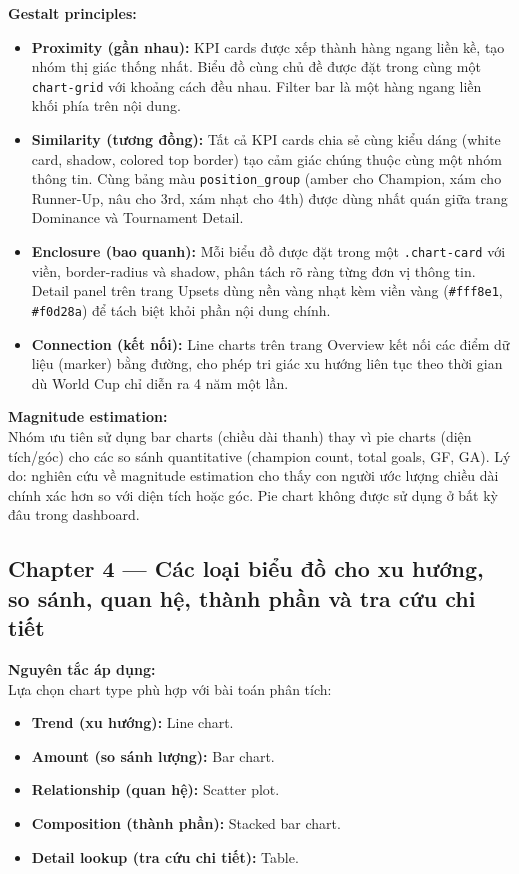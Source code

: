 \documentclass[12pt,a4paper]{article}
\begin{document}
\textbf{Gestalt principles:}
\begin{itemize}
    \item \textbf{Proximity (gần nhau):} KPI cards được xếp thành hàng ngang liền kề, tạo nhóm thị giác thống nhất. Biểu đồ cùng chủ đề được đặt trong cùng một \texttt{chart-grid} với khoảng cách đều nhau. Filter bar là một hàng ngang liền khối phía trên nội dung.
    \item \textbf{Similarity (tương đồng):} Tất cả KPI cards chia sẻ cùng kiểu dáng (white card, shadow, colored top border) tạo cảm giác chúng thuộc cùng một nhóm thông tin. Cùng bảng màu \texttt{position\_group} (amber cho Champion, xám cho Runner-Up, nâu cho 3rd, xám nhạt cho 4th) được dùng nhất quán giữa trang Dominance và Tournament Detail.
    \item \textbf{Enclosure (bao quanh):} Mỗi biểu đồ được đặt trong một \texttt{.chart-card} với viền, border-radius và shadow, phân tách rõ ràng từng đơn vị thông tin. Detail panel trên trang Upsets dùng nền vàng nhạt kèm viền vàng (\texttt{\#fff8e1}, \texttt{\#f0d28a}) để tách biệt khỏi phần nội dung chính.
    \item \textbf{Connection (kết nối):} Line charts trên trang Overview kết nối các điểm dữ liệu (marker) bằng đường, cho phép tri giác xu hướng liên tục theo thời gian dù World Cup chỉ diễn ra 4 năm một lần.
\end{itemize}

\textbf{Magnitude estimation:} \\
Nhóm ưu tiên sử dụng bar charts (chiều dài thanh) thay vì pie charts (diện tích/góc) cho các so sánh quantitative (champion count, total goals, GF, GA). Lý do: nghiên cứu về magnitude estimation cho thấy con người ước lượng chiều dài chính xác hơn so với diện tích hoặc góc. Pie chart không được sử dụng ở bất kỳ đâu trong dashboard.

\subsection{Chapter 4 --- Các loại biểu đồ cho xu hướng, so sánh, quan hệ, thành phần và tra cứu chi tiết}
\textbf{Nguyên tắc áp dụng:} \\
Lựa chọn chart type phù hợp với bài toán phân tích:
\begin{itemize}
    \item \textbf{Trend (xu hướng):} Line chart.
    \item \textbf{Amount (so sánh lượng):} Bar chart.
    \item \textbf{Relationship (quan hệ):} Scatter plot.
    \item \textbf{Composition (thành phần):} Stacked bar chart.
    \item \textbf{Detail lookup (tra cứu chi tiết):} Table.
\end{itemize}
\end{document}
